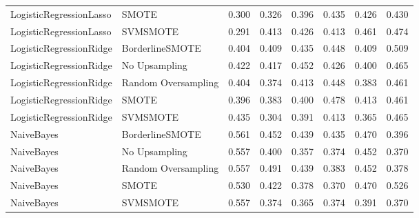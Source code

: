 \begin{tabular}{llllllll}
     LogisticRegressionLasso &               SMOTE & 0.300 &                     0.326 &                 0.396 &                  0.435 &                                   0.426 &    0.430 \\
     LogisticRegressionLasso &            SVMSMOTE & 0.291 &                     0.413 &                 0.426 &                  0.413 &                                   0.461 &    0.474 \\
     LogisticRegressionRidge &     BorderlineSMOTE & 0.404 &                     0.409 &                 0.435 &                  0.448 &                                   0.409 &    0.509 \\
     LogisticRegressionRidge &       No Upsampling & 0.422 &                     0.417 &                 0.452 &                  0.426 &                                   0.400 &    0.465 \\
     LogisticRegressionRidge & Random Oversampling & 0.404 &                     0.374 &                 0.413 &                  0.448 &                                   0.383 &    0.461 \\
     LogisticRegressionRidge &               SMOTE & 0.396 &                     0.383 &                 0.400 &                  0.478 &                                   0.413 &    0.461 \\
     LogisticRegressionRidge &            SVMSMOTE & 0.435 &                     0.304 &                 0.391 &                  0.413 &                                   0.365 &    0.465 \\
                  NaiveBayes &     BorderlineSMOTE & 0.561 &                     0.452 &                 0.439 &                  0.435 &                                   0.470 &    0.396 \\
                  NaiveBayes &       No Upsampling & 0.557 &                     0.400 &                 0.357 &                  0.374 &                                   0.452 &    0.370 \\
                  NaiveBayes & Random Oversampling & 0.557 &                     0.491 &                 0.439 &                  0.383 &                                   0.452 &    0.378 \\
                  NaiveBayes &               SMOTE & 0.530 &                     0.422 &                 0.378 &                  0.370 &                                   0.470 &    0.526 \\
                  NaiveBayes &            SVMSMOTE & 0.557 &                     0.374 &                 0.365 &                  0.374 &                                   0.391 &    0.370 \\

\end{tabular}
